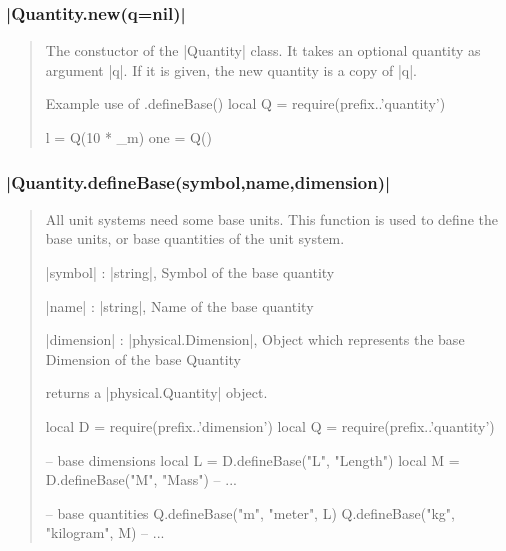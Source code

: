 \documentclass{ltxdoc}
\begin{document}
\subsubsection*{|Quantity.new(q=nil)|}
\begin{quote}
  The constuctor of the |Quantity| class. It takes an optional quantity as argument |q|. If it is given, the new quantity is a copy of |q|.

  \begin{example}{Example use of .defineBase()}
    local Q = require(prefix..'quantity')

    l = Q(10 * _m)
    one = Q()
  \end{example}

\end{quote}



\subsubsection*{|Quantity.defineBase(symbol,name,dimension)|}
\begin{quote}
  All unit systems need some base units. This function is used to define the base units, or base quantities of the unit system.

  \begin{description}
  \item |symbol| : |string|, Symbol of the base quantity

  \item |name| : |string|, Name of the base quantity

  \item |dimension| : |physical.Dimension|, Object which represents the base Dimension of the base Quantity

  \item returns a |physical.Quantity| object.
  \end{description}

  \begin{example}{}
  local D = require(prefix..'dimension')
  local Q = require(prefix..'quantity')

  -- base dimensions
  local L = D.defineBase("L", "Length")
  local M = D.defineBase("M", "Mass")
  -- ...

  -- base quantities
  Q.defineBase("m", "meter", L)
  Q.defineBase("kg", "kilogram", M)
  -- ...
  \end{example}
\end{quote}
\end{document}
